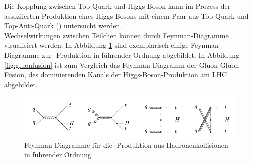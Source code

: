 Die Kopplung zwischen Top-Quark und Higgs-Boson kann im Prozess der assoziierten Produktion eines Higgs-Bosons mit einem Paar aus Top-Quark und Top-Anti-Quark (\ttH) untersucht werden.\\
Wechselwirkungen zwischen Teilchen k\"onnen durch Feynman-Diagramme visualisiert werden. In Abbildung \ref{fig:ttH_feynmans} sind exemplarisch einige Feynman-Diagramme zur \ttH-Produktion in f\"uhrender Ordnung abgebildet.%
In Abbildung \ref{fig:gluonfusion} ist zum Vergleich das Feynman-Diagramm der Gluon-Gluon-Fusion, des dominierenden Kanals der Higgs-Boson-Produktion am LHC abgebildet.


 \begin{figure}[tbp]
  \begin{center}
    \includegraphics[width=\textwidth]{graphics/ttH_feynmans.png}
    \parbox[b]{12cm}{
      \caption[\ttH Feynman-Diagramme]
             {\label{fig:ttH_feynmans}\!Feynman-Diagramme f\"ur die \ttH-Produktion aus Hadronenkollisionen in f\"uhrender Ordnung \cite{hep-ph/0211352}}
   }
 \end{center}
\end{figure}


